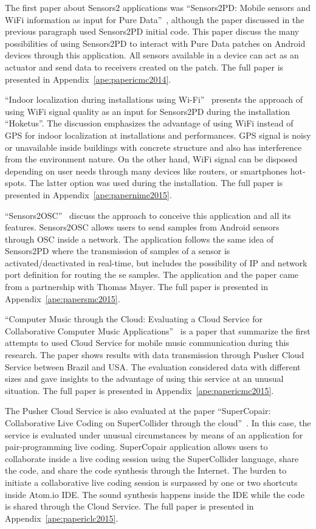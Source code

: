 The first paper about Sensors2 applications was ``Sensors2PD: Mobile sensors and WiFi information as input for Pure Data''~\citep{deCarvalhoJunior2014sensors2pd},
although the paper discussed in the previous paragraph used Sensors2PD initial code.
This paper discuss the many possibilities of using Sensors2PD to interact with Pure Data patches on Android devices through this application.
All sensors available in a device can act as an actuator and send data to receivers created on the patch.
The full paper is presented in Appendix~\ref{ape:papericmc2014}.

``Indoor localization during installations using Wi-Fi''~\citep{deCarvalhoJunior2015indoor} presents the approach of using WiFi signal quality as an input for Sensors2PD during the installation ``Hoketus''.
The discussion emphasizes the advantage of using WiFi instead of GPS for indoor localization at installations and performances.
GPS signal is noisy or unavailable inside buildings with concrete structure and also has interference from the environment nature.
On the other hand, WiFi signal can be disposed depending on user needs through many devices like routers, or smartphones hot-spots. 
The latter option was used during the installation.
The full paper is presented in Appendix~\ref{ape:papernime2015}.

``Sensors2OSC''~\citep{deCarvalhoJunior2015sensors2osc} discuss the approach to conceive this application and all its features.
Sensors2OSC allows users to send samples from Android sensors through OSC inside a network.
The application follows the same idea of Sensors2PD where the transmission of samples of a sensor is activated/deactivated in real-time, but includes the possibility of IP and network port definition for routing the se samples.
The application and the paper came from a partnership with Thomas Mayer.
The full paper is presented in Appendix~\ref{ape:papersmc2015}.

``Computer Music through the Cloud: Evaluating a Cloud Service for Collaborative Computer Music Applications''~\citep{deCarvalhoJunior2015computer} is a paper that summarize the first attempts to used Cloud Service for mobile music communication during this research.
The paper shows results with data transmission through Pusher Cloud Service between Brazil and USA.
The evaluation considered data with different sizes and gave insights to the advantage of using this service at an unusual situation.
The full paper is presented in Appendix~\ref{ape:papericmc2015}.

The Pusher Cloud Service is also evaluated at the paper ``SuperCopair: Collaborative Live Coding on SuperCollider through the cloud''~\citep{deCarvalhoJunior2015supercopair}.
In this case, the service is evaluated under unusual circumstances by means of an application for pair-programming live coding.
SuperCopair application allows users to collaborate inside a live coding session using the SuperCollider language, share the code, and share the code synthesis through the Internet.
The burden to initiate a collaborative live coding session is surpassed by one or two shortcuts inside Atom.io IDE.
The sound synthesis happens inside the IDE while the code is shared through the Cloud Service.
The full paper is presented in Appendix~\ref{ape:papericlc2015}.

